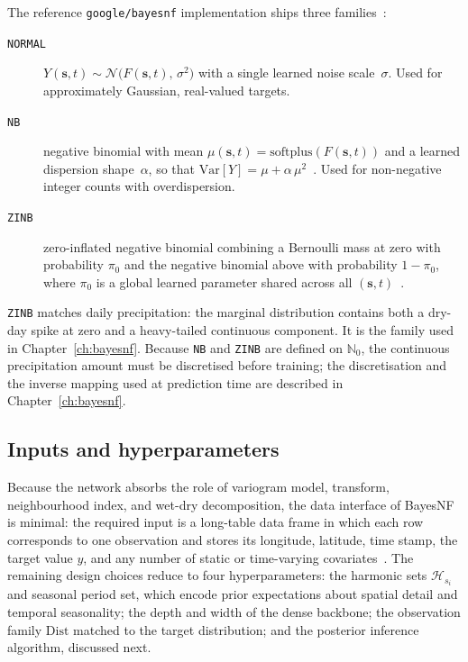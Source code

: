The reference \texttt{google/bayesnf} implementation ships three
families~\cite{bayesnfRepo}:
\begin{description}
  \item[\texttt{NORMAL}] $Y(\mathbf{s},t) \sim
    \mathcal{N}\!\bigl(F(\mathbf{s},t),\,\sigma^{2}\bigr)$
    with a single learned noise scale~$\sigma$. Used for
    approximately Gaussian, real-valued targets.
  \item[\texttt{NB}] negative binomial with mean
    $\mu(\mathbf{s},t)=\mathrm{softplus}(F(\mathbf{s},t))$ and a learned
    dispersion shape~$\alpha$, so that
    $\mathrm{Var}[Y] = \mu + \alpha\,\mu^{2}$~\cite{bayesnfRepo}.
    Used for non-negative integer counts with overdispersion.
  \item[\texttt{ZINB}] zero-inflated negative binomial combining a
    Bernoulli mass at zero with probability $\pi_{0}$ and the
    negative binomial above with probability $1-\pi_{0}$, where $\pi_{0}$
    is a global learned parameter shared across all
    $(\mathbf{s},t)$~\cite{bayesnfRepo}.
\end{description}
\texttt{ZINB} matches daily precipitation: the marginal distribution
contains both a dry-day spike at zero and a heavy-tailed continuous
component. It is the family used in Chapter~\ref{ch:bayesnf}. Because
\texttt{NB} and \texttt{ZINB} are defined on $\mathbb{N}_{0}$, the
continuous precipitation amount must be discretised before training;
the discretisation and the inverse mapping used at prediction time are
described in Chapter~\ref{ch:bayesnf}.

\subsection{Inputs and hyperparameters}
\label{sec:theory-bayesnf-data}

Because the network absorbs the role of variogram model, transform,
neighbourhood index, and wet-dry decomposition, the data interface of
BayesNF is minimal: the required input is a long-table data frame in
which each row corresponds to one observation and stores its longitude,
latitude, time stamp, the target value $y$, and any number of static or
time-varying covariates~\cite{bayesnfRepo}. The remaining design choices
reduce to four hyperparameters: the harmonic sets $\mathcal{H}_{s_i}$ and
seasonal period set, which encode prior
expectations about spatial detail and temporal seasonality; the depth and
width of the dense backbone; the observation family $\mathrm{Dist}$
matched to the target distribution; and the posterior inference
algorithm, discussed next.

